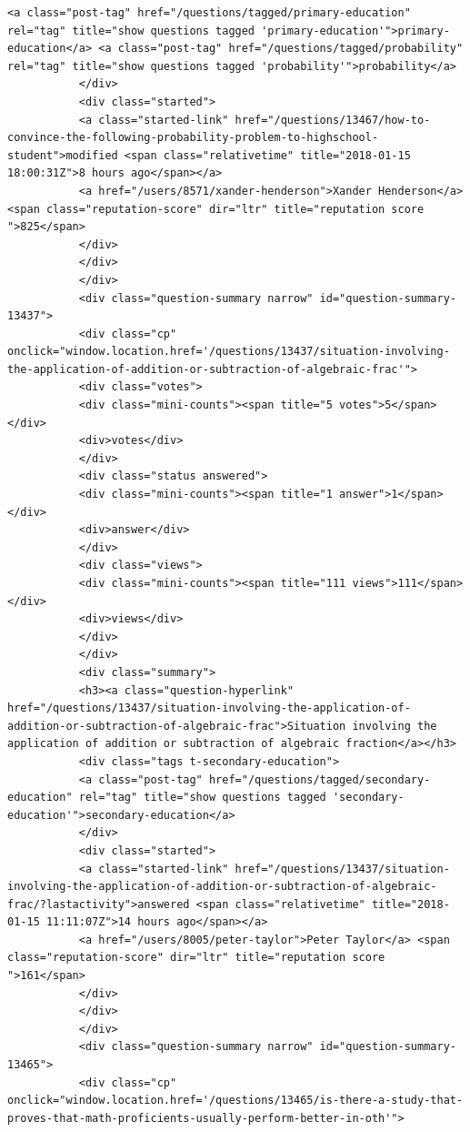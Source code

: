 \documentclass[11pt]{article}
\begin{document}
\begin{Verbatim}[commandchars=\\\{\}]
           <a class="post-tag" href="/questions/tagged/primary-education" rel="tag" title="show questions tagged 'primary-education'">primary-education</a> <a class="post-tag" href="/questions/tagged/probability" rel="tag" title="show questions tagged 'probability'">probability</a>
           </div>
           <div class="started">
           <a class="started-link" href="/questions/13467/how-to-convince-the-following-probability-problem-to-highschool-student">modified <span class="relativetime" title="2018-01-15 18:00:31Z">8 hours ago</span></a>
           <a href="/users/8571/xander-henderson">Xander Henderson</a> <span class="reputation-score" dir="ltr" title="reputation score ">825</span>
           </div>
           </div>
           </div>
           <div class="question-summary narrow" id="question-summary-13437">
           <div class="cp" onclick="window.location.href='/questions/13437/situation-involving-the-application-of-addition-or-subtraction-of-algebraic-frac'">
           <div class="votes">
           <div class="mini-counts"><span title="5 votes">5</span></div>
           <div>votes</div>
           </div>
           <div class="status answered">
           <div class="mini-counts"><span title="1 answer">1</span></div>
           <div>answer</div>
           </div>
           <div class="views">
           <div class="mini-counts"><span title="111 views">111</span></div>
           <div>views</div>
           </div>
           </div>
           <div class="summary">
           <h3><a class="question-hyperlink" href="/questions/13437/situation-involving-the-application-of-addition-or-subtraction-of-algebraic-frac">Situation involving the application of addition or subtraction of algebraic fraction</a></h3>
           <div class="tags t-secondary-education">
           <a class="post-tag" href="/questions/tagged/secondary-education" rel="tag" title="show questions tagged 'secondary-education'">secondary-education</a>
           </div>
           <div class="started">
           <a class="started-link" href="/questions/13437/situation-involving-the-application-of-addition-or-subtraction-of-algebraic-frac/?lastactivity">answered <span class="relativetime" title="2018-01-15 11:11:07Z">14 hours ago</span></a>
           <a href="/users/8005/peter-taylor">Peter Taylor</a> <span class="reputation-score" dir="ltr" title="reputation score ">161</span>
           </div>
           </div>
           </div>
           <div class="question-summary narrow" id="question-summary-13465">
           <div class="cp" onclick="window.location.href='/questions/13465/is-there-a-study-that-proves-that-math-proficients-usually-perform-better-in-oth'">

\end{Verbatim}
\end{document}
